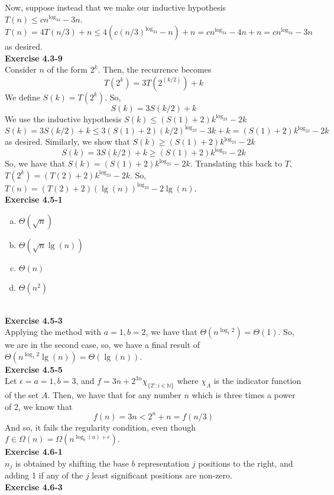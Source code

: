 \documentclass{article}
\begin{document}
Now, suppose instead that we make our inductive hypothesis $T(n) \le cn^{\log_34} -3n$.
\[
T(n) = 4T(n/3)+n \le 4(c(n/3)^{\log_34}-n) +n = cn^{\log_34} - 4n + n =cn^{\log_34} - 3n 
\]
as desired.\\
\noindent\textbf{Exercise 4.3-9}\\
Consider $n$ of the form $2^k$. Then, the recurrence becomes
\[
T(2^k) = 3 T(2^(k/2)) +k
\]
We define $S(k) = T(2^k)$. So,
\[
S(k) =3S(k/2)+k
\]
We use the inductive hypothesis $S(k)\le (S(1)+2) k^{\log_23} - 2k$
\[
S(k) = 3S(k/2)+k \le 3(S(1)+2)(k/2)^{\log_23} -3k+k = (S(1)+2)k^{\log_23} - 2k
\]
as desired. Similarly, we show that $S(k) \ge (S(1)+2) k^{\log_23} -2k$
\[
S(k) = 3S(k/2) +k \ge (S(1)+2)k^{\log_23} -2k
\]
So, we have that $S(k) = (S(1)+2)k^{\log_23}-2k$. Translating this back to $T$, $T(2^k) = (T(2)+2) k^{\log_23} -2k$. So, $T(n) = (T(2)+2)(\lg(n))^{\log_23} - 2\lg(n)$.\\
\noindent\textbf{Exercise 4.5-1}\\
\begin{enumerate}[a)]
\item
$\Theta(\sqrt{n})$
\item
$\Theta(\sqrt{n}\lg(n))$
\item
$\Theta(n)$
\item
$\Theta(n^2)$
\end{enumerate}\\
\noindent\textbf{Exercise 4.5-3}\\
Applying the method with $a=1,b=2$, we have that $\Theta(n^{\log_1 2}) = \Theta(1)$. So, we are in the second case, so, we have a final result of $\Theta(n^{\log_1 2}\lg(n)) = \Theta(\lg(n))$.\\
\noindent\textbf{Exercise 4.5-5}\\
Let $\epsilon = a=1,b=3$, and $f = 3n + 2^{3n} \chi_{\{2^i:i\in\mathbb{N}\}}$ where $\chi_A$ is the indicator function of the set $A$. Then, we have that for any number $n$ which is three times a power of 2, we know that 
\[
f(n) = 3n < 2^n + n = f(n/3)
\]
And so, it fails the regularity condition, even though $f \in \Omega(n) =\Omega(n^{\log_b(a) + \epsilon})$.\\
\noindent\textbf{Exercise 4.6-1}\\
$n_j$ is obtained by shifting the base $b$ representation $j$ positions to the right, and adding 1 if any of the $j$ least significant positions are non-zero.\\
\noindent\textbf{Exercise 4.6-3}\\
\end{document}
